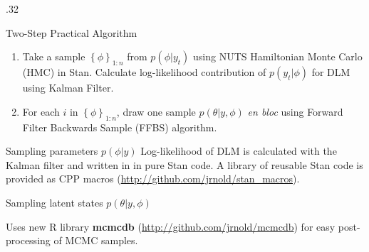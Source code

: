 \documentclass[final]{beamer}
\newcommand{\proglang}[1]{\textsf{#1}}
\newcommand{\RLang}{\proglang{R}}
\newcommand{\Stan}{\proglang{Stan}}
\def \ColTwo {.32\textwidth}
\begin{document}
\begin{frame}[fragile]
\begin{columns}[t]
\begin{column}{\ColTwo}
\begin{block}{Two-Step Practical Algorithm}
        \begin{enumerate}
        \item Take a sample $\left\{ \phi \right\}_{1:n}$ from $p(\phi | y_{t})$ using NUTS Hamiltonian Monte Carlo (HMC) in \Stan{}.
          Calculate log-likelihood contribution of $p(y_{t} | \phi)$ for DLM using Kalman Filter.
        \item For each $i$ in $\left\{ \phi \right\}_{1:n}$, draw one sample $p(\theta | y, \phi)$ \textit{en bloc} using Forward Filter Backwards Sample (FFBS) algorithm.
        \end{enumerate}
      \end{block}

      \begin{block}{Sampling parameters $p(\phi | y)$}
          Log-likelihood of DLM is calculated with the Kalman filter and written in in pure \Stan{} code.
          A library of reusable \Stan{} code is provided as CPP macros (\url{http://github.com/jrnold/stan_macros}).

          \vspace{1em}
          
      \end{block}

      \begin{block}{Sampling latent states $p(\theta | y, \phi)$}

        Uses new \RLang{} library \textbf{mcmcdb} (\url{http://github.com/jrnold/mcmcdb}) for easy post-processing of MCMC samples.

        \vspace{1em}
        
      \end{block}

    \end{column}
  \end{columns}
\end{frame}
\end{document}
